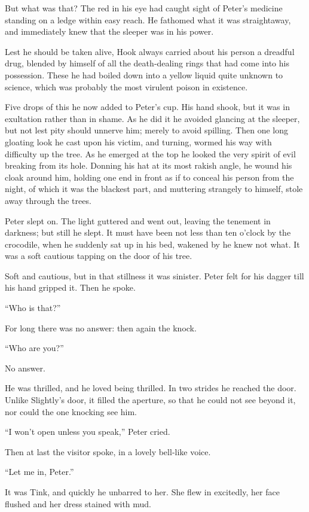 But what was that?
The red in his eye had caught sight of Peter’s medicine standing on a ledge within easy reach.
He fathomed what it was straightaway, and immediately knew that the sleeper was in his power.

Lest he should be taken alive, Hook always carried about his person a dreadful drug,
blended by himself of all the death‐dealing rings that had come into his possession.
These he had boiled down into a yellow liquid quite unknown to science,
which was probably the most virulent poison in existence.

Five drops of this he now added to Peter’s cup.
His hand shook, but it was in exultation rather than in shame.
As he did it he avoided glancing at the sleeper, but not lest pity should unnerve him;
merely to avoid spilling.
Then one long gloating look he cast upon his victim, and turning, wormed his way with difficulty up the tree.
As he emerged at the top he looked the very spirit of evil breaking from its hole.
Donning his hat at its most rakish angle,
he wound his cloak around him,
holding one end in front as if to conceal his person from the night, of which it was the blackest part,
and muttering strangely to himself, stole away through the trees.

Peter slept on.
The light guttered and went out, leaving the tenement in darkness;
but still he slept.
It must have been not less than ten o’clock by the crocodile,
when he suddenly sat up in his bed, wakened by he knew not what.
It was a soft cautious tapping on the door of his tree.

Soft and cautious, but in that stillness it was sinister.
Peter felt for his dagger till his hand gripped it.
Then he spoke.

“Who is that?”

For long there was no answer:
then again the knock.

“Who are you?”

No answer.

He was thrilled, and he loved being thrilled.
In two strides he reached the door.
Unlike Slightly’s door, it filled the aperture,
so that he could not see beyond it, nor could the one knocking see him.

“I won’t open unless you speak,” Peter cried.

Then at last the visitor spoke, in a lovely bell‐like voice.

“Let me in, Peter.”

It was Tink, and quickly he unbarred to her.
She flew in excitedly, her face flushed and her dress stained with mud.

